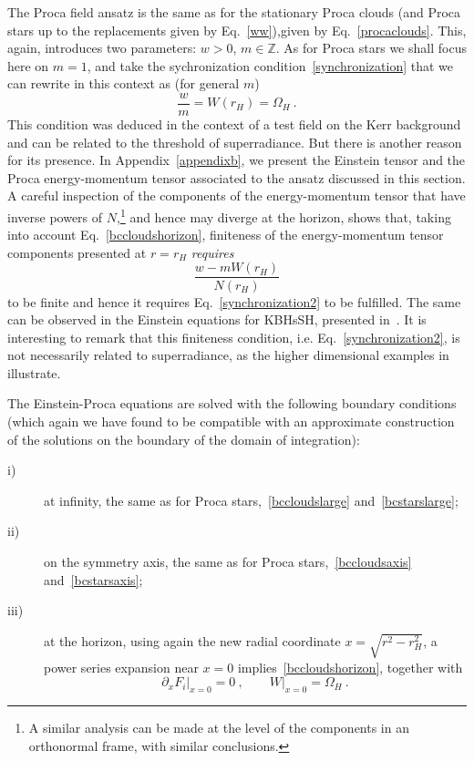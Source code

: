 The Proca field ansatz is the same as for the stationary Proca clouds (and Proca stars up to the replacements given by Eq.~\eqref{ww}),given by Eq.~\eqref{procaclouds}.
This, again, introduces two parameters: $w>0$, $m\in \mathbb{Z}$.
As for Proca stars we shall focus here on $m=1$, and take the sychronization condition~\eqref{synchronization} that we can rewrite in this context as (for general $m$)
\begin{equation}
\frac{w}{m}=W(r_H) =\Omega_H\ . 
\label{synchronization2}
\end{equation}
This condition was deduced in the context of a test field on the Kerr background and can be related to the threshold of superradiance.
But there is another reason for its presence.
In Appendix~\ref{appendixb}, we present the Einstein tensor and the Proca energy-momentum tensor associated to the ansatz discussed in this section.
A careful inspection of the components of the energy-momentum tensor that have inverse powers of $N$,\footnote{A similar analysis can be made at the level of the components in an orthonormal frame, with similar conclusions.} and hence may diverge at the horizon, shows that, taking into account Eq.~\eqref{bccloudshorizon}, finiteness of the energy-momentum tensor components presented at $r=r_H$ \textit{requires}
\begin{equation}
\frac{w-mW(r_H)}{N(r_H)} 
\end{equation}
to be finite and hence it requires Eq.~\eqref{synchronization2} to be fulfilled.
The same can be observed in the Einstein equations for KBHsSH, presented in~\cite{Herdeiro:2015gia}.
It is interesting to remark that this finiteness condition, i.e. Eq.~\eqref{synchronization2}, is not necessarily related to superradiance, as the higher dimensional examples in~\cite{Brihaye:2014nba,Herdeiro:2015kha} illustrate. 


The Einstein-Proca equations are solved with the following boundary conditions (which again we have found to be compatible with an approximate construction of the solutions
on the boundary of the domain of integration):  
\begin{description}
\item[i)] at infinity, the same as for Proca stars,~\eqref{bccloudslarge} and~\eqref{bcstarslarge};
\item[ii)] on the symmetry axis, the same as for Proca stars,~\eqref{bccloudsaxis} and~\eqref{bcstarsaxis};
 
\item[iii)] at the horizon, using again the new radial coordinate $x=\sqrt{r^2-r_H^2}$, a power series expansion near $x=0$ implies~\eqref{bccloudshorizon}, together with
\begin{equation}
\partial_x F_i\big|_{x=0}=0 \ , \qquad W\big|_{x=0}=\Omega_H \ .
\end{equation}
\end{description}

